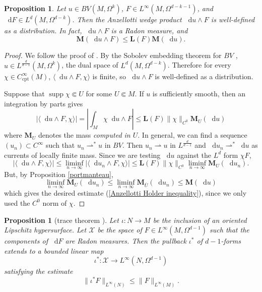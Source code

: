 \documentclass[reqno,11pt]{amsart}
\newcommand*\dif{\mathop{}\!\mathrm{d}}
\DeclareMathOperator{\supp}{supp}
\newcommand{\weakto}{\rightharpoonup}
\newcommand{\Mass}{\mathbf M}
\newcommand{\Comass}{\mathbf L}
\newcommand{\cpt}{\mathrm{cpt}}
\newtheorem{proposition}[theorem]{Proposition}
\theoremstyle{definition}
\numberwithin{equation}{section}
\begin{document}
\begin{proposition}\label{Anzellotti wedge product exists}
Let $u \in BV(M, \Omega^k)$, $F \in L^\infty(M, \Omega^{d - k - 1})$, and $\dif F \in L^d(M, \Omega^{d - k})$.
Then the Anzellotti wedge product $\dif u \wedge F$ is well-defined as a distribution.
In fact, $\dif u \wedge F$ is a Radon measure, and 
\begin{equation}\label{Anzellotti Holder inequality}
\Mass(\dif u \wedge F) \leq \Comass(F) \Mass(\dif u).
\end{equation}
\end{proposition}
\begin{proof}
We follow the proof of \cite[Theorem 1.5]{Anzellotti1983}.
By the Sobolev embedding theorem for $BV$ \cite[\S5.6]{evans2015measure}, $u \in L^{\frac{d}{d - 1}}(M, \Omega^k)$, the dual space of $L^d(M, \Omega^{d - k})$.
Therefore for every $\chi \in C^\infty_\cpt(M)$, $\langle \dif u \wedge F, \chi\rangle$ is finite, so $\dif u \wedge F$ is well-defined as a distribution.

Suppose that $\supp \chi \Subset U$ for some $U \Subset M$.
If $u$ is sufficiently smooth, then an integration by parts gives 
$$|\langle \dif u \wedge F, \chi\rangle| = \left|\int_M \chi \dif u \wedge F\right| \leq \Comass(F) \|\chi\|_{C^0} \Mass_U(\dif u)$$
where $\Mass_U$ denotes the mass \emph{computed in $U$}.
In general, we can find a sequence $(u_n) \subset C^\infty$ such that $u_n \weakto^* u$ in $BV$.
Then $u_n \weakto u$ in $L^{\frac{d}{d - 1}}$ and $\dif u_n \weakto^* \dif u$ as currents of locally finite mass.
Since we are testing $\dif u$ against the $L^d$ form $\chi F$,
$$|\langle \dif u \wedge F, \chi\rangle| \leq \liminf_{n \to \infty} |\langle \dif u_n \wedge F, \chi\rangle| \leq \Comass(F) \|\chi\|_{C^0} \liminf_{n \to \infty} \Mass_U(\dif u_n).$$
But, by Proposition \ref{portmanteau},
$$\liminf_{n \to \infty} \Mass_U(\dif u_n) \leq \liminf_{n \to \infty} \Mass_{\overline U}(\dif u_n) \leq \Mass(\dif u)$$
which gives the desired estimate (\ref{Anzellotti Holder inequality}), since we only used the $C^0$ norm of $\chi$.
\end{proof}

\begin{proposition}[trace theorem {\cite[Theorem 1.2]{Anzellotti1983}}]\label{integration is welldefined}
Let $\iota: N \to M$ be the inclusion of an oriented Lipschitz hypersurface.
Let $\mathcal X$ be the space of $F \in L^\infty(M, \Omega^{d - 1})$ such that the components of $\dif F$ are Radon measures.
Then the pullback $\iota^*$ of $d - 1$-forms extends to a bounded linear map
$$\iota^*: \mathcal X \to L^\infty(N, \Omega^{d - 1})$$
satisfying the estimate
\begin{equation}\label{integral over chain is linfinity}
	\|\iota^* F\|_{L^\infty(N)} \leq \|F\|_{L^\infty(M)}.
\end{equation}
\end{proposition}
\end{document}
